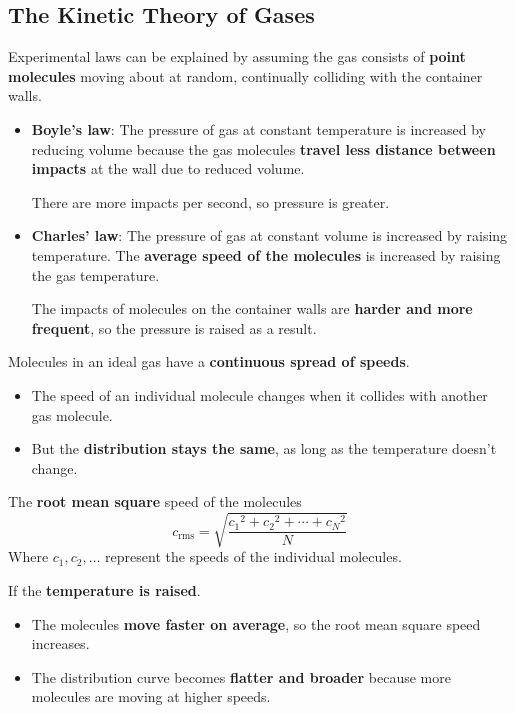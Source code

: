 \subsection{The Kinetic Theory of Gases}

Experimental laws can be explained by assuming the gas consists of \textbf{point molecules} moving about at random, continually colliding with the container walls.

\begin{itemize}
    \item \textbf{Boyle's law}: The pressure of gas at constant temperature is increased by reducing volume because the gas molecules \textbf{travel less distance between impacts} at the wall due to reduced volume.

        There are more impacts per second, so pressure is greater.

    \item \textbf{Charles' law}: The pressure of gas at constant volume is increased by raising temperature. The \textbf{average speed of the molecules} is increased by raising the gas temperature.

        The impacts of molecules on the container walls are \textbf{harder and more frequent}, so the pressure is raised as a result.
\end{itemize}

Molecules in an ideal gas have a \textbf{continuous spread of speeds}.
\begin{itemize}
    \item The speed of an individual molecule changes when it collides with another gas molecule.
    \item But the \textbf{distribution stays the same}, as long as the temperature doesn't change.
\end{itemize}

The \textbf{root mean square} speed of the molecules
$$c_\text{rms}=\sqrt{\frac{{c_1}^2+{c_2}^2+\cdots+{c_N}^2}{N}}$$
Where $c_1,c_2,\dots$ represent the speeds of the individual molecules.

If the \textbf{temperature is raised}.
\begin{itemize}
    \item The molecules \textbf{move faster on average}, so the root mean square speed increases.
    \item The distribution curve becomes \textbf{flatter and broader} because more molecules are moving at higher speeds.
\end{itemize}

